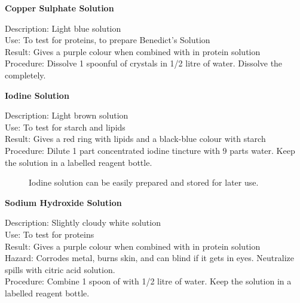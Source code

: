 \begin{flushleft}
\textbf{Copper Sulphate Solution}
\end{flushleft}
\vspace{-10pt}
Description: Light blue solution\\
Use: To test for proteins, to prepare Benedict's Solution\\
Result: Gives a purple colour when combined with  in protein solution\\
Procedure: Dissolve 1 spoonful of  crystals in 1/2 litre of water. Dissolve the  completely.\\

\begin{flushleft}
\textbf{Iodine Solution}
\end{flushleft}
\vspace{-10pt}
Description: Light brown solution\\
Use: To test for starch and lipids\\
Result: Gives a red ring with lipids and a black-blue colour with starch\\
Procedure: Dilute 1 part concentrated iodine tincture with 9 parts water. Keep the solution in a labelled reagent bottle.\\

\begin{figure}[h]
\begin{center}
\def\svgwidth{2cm}

\caption{Iodine solution can be easily prepared and stored for later use.}
\label{fig:iodine}
\end{center}
\end{figure}

\begin{flushleft}
\textbf{Sodium Hydroxide Solution}
\end{flushleft}
\vspace{-10pt}
Description: Slightly cloudy white solution\\
Use: To test for proteins\\
Result: Gives a purple colour when combined with  in protein solution\\
Hazard: Corrodes metal, burns skin, and can blind if it gets in eyes. Neutralize spills with citric acid solution.\\
Procedure: Combine 1 spoon of  with 1/2 litre of water. Keep the solution in a labelled reagent bottle.\\

